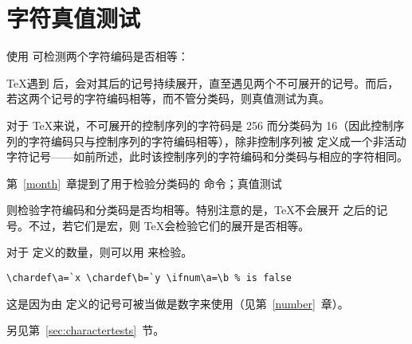\documentclass{book}
\begin{document}
\section{字符真值测试}

使用  可检测两个字符编码是否相等：
\begin{disp}\end{disp}
\TeX 遇到  后，会对其后的记号持续展开，直至遇见两个不可展开的记号。而后，若这两个记号的字符编码相等，而不管分类码，则真值测试为真。

对于 \TeX 来说，不可展开的控制序列的字符码是 256 而分类码为 16（因此控制序列的字符编码只与控制序列的字符编码相等），除非控制序列被  定义成一个非活动字符记号——如前所述，此时该控制序列的字符编码和分类码与相应的字符相同。

第~\ref{month}~章提到了用于检验分类码的  命令；真值测试
\begin{disp}\end{disp}
则检验字符编码和分类码是否均相等。特别注意的是，\TeX 不会展开  之后的记号。不过，若它们是宏，则 \TeX 会检验它们的展开是否相等。

对于  定义的数量，则可以用  来检验。
\begin{verbatim}
\chardef\a=`x \chardef\b=`y \ifnum\a=\b % is false
\end{verbatim}
这是因为由  定义的记号可被当做是数字来使用（见第~\ref{number}~章）。

另见第~\ref{sec:charactertests}~节。
\end{document}
